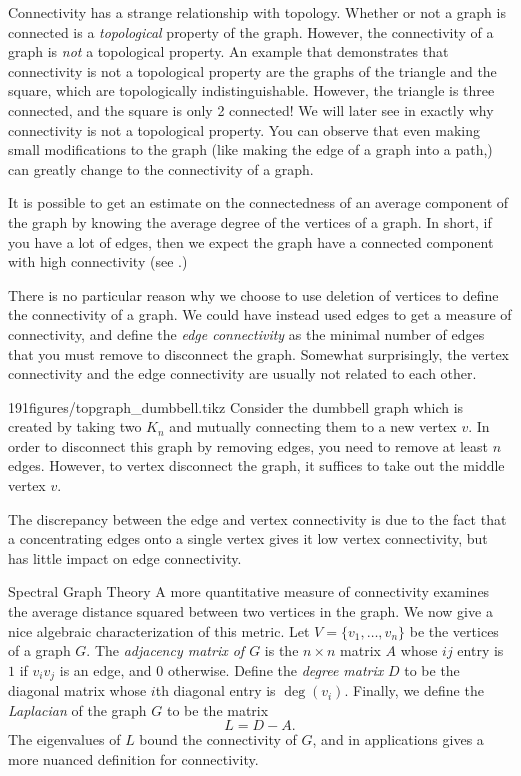 Connectivity has a strange relationship with topology.
Whether or not a graph is connected is a \emph{topological} property of the graph. However, the connectivity of a graph is \emph{not} a topological property.
An example that demonstrates that connectivity is not a topological property are the graphs of the triangle and the square, which are topologically indistinguishable.
However, the triangle is three connected, and the square is only 2 connected! We will later see in  exactly why connectivity is not a topological property. 
You can observe that even making small modifications to the graph (like making the edge of a graph into a path,) can greatly change to the connectivity of a graph. 

It is possible to get an estimate on the connectedness of an average component of the graph by knowing the average degree of the vertices of a graph.
In short, if you have a lot of edges, then we expect the graph have a connected component with high connectivity (see .)



There is no particular reason why we choose to use deletion of vertices to define the connectivity of a graph. 
We could have instead used edges to get a measure of connectivity, and define the \emph{edge connectivity} as the minimal number of edges that you must remove to disconnect the graph.
Somewhat surprisingly, the vertex connectivity and the edge connectivity are usually not related to each other.
\begin{examplefigureenv}{191figures/topgraph_dumbbell.tikz}
Consider the dumbbell graph which is created by taking two $K_n$ and mutually connecting them to a new vertex $v$. 
In order to disconnect this graph by removing edges, you need to remove at least $n$ edges.
However, to vertex disconnect the graph, it suffices to take out the middle vertex $v$.
\label{fig:graph:dumbell}
\end{examplefigureenv}
The discrepancy between the edge and vertex connectivity is due to the fact that a concentrating edges onto a single vertex gives it low vertex connectivity, but has little impact on edge connectivity.


\begin{projectdescription}{Spectral Graph Theory}
A more quantitative measure of connectivity examines the average distance squared between two vertices in the graph.\label{proj:spectral}
We now give a nice algebraic characterization of this metric. 
Let  $V=\{v_1, \ldots, v_n\}$ be the vertices of a graph $G$. 
The \emph{adjacency matrix of $G$}  is the $n\times n$ matrix $A$ whose $ij$ entry is $1$ if $v_iv_j$ is an edge, and $0$ otherwise.
Define the \emph{degree matrix} $D$ to be the diagonal matrix whose $i$th diagonal entry  is $\deg(v_i)$.
Finally, we define the \emph{Laplacian} of the graph $G$ to be the matrix 
\[
	L=D-A.
\]
The eigenvalues of $L$ bound the connectivity of $G$, and in applications gives a more nuanced definition for connectivity.
\end{projectdescription}

